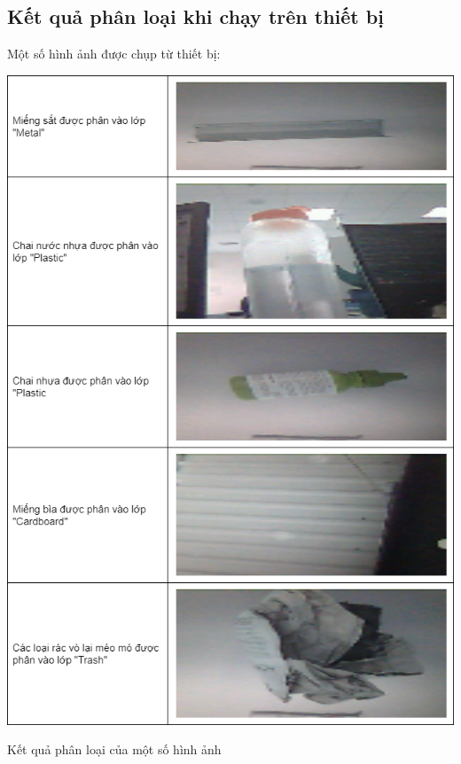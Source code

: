 \subsection{Kết quả phân loại khi chạy trên thiết bị}

Một số hình ảnh được chụp từ thiết bị:
\begin{table}[H]
    \centering
    \includegraphics[width=\linewidth]{images/Quanh/Trash Result.png}
    \caption{Kết quả phân loại của một số hình ảnh}
    \label{fig:trash_result}
\end{table}

